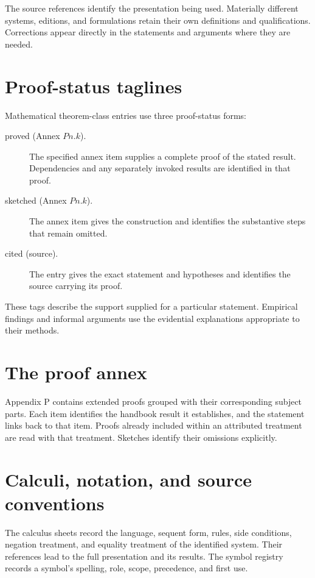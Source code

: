 The source references identify the presentation being used. Materially
different systems, editions, and formulations retain their own definitions
and qualifications. Corrections appear directly in the statements and
arguments where they are needed.

\section*{Proof-status taglines}

Mathematical theorem-class entries use three proof-status forms:
\begin{description}
\item[proved (Annex \(P n.k\)).]
The specified annex item supplies a complete proof of the stated result.
Dependencies and any separately invoked results are identified in that
proof.
\item[sketched (Annex \(P n.k\)).]
The annex item gives the construction and identifies the substantive
steps that remain omitted.
\item[cited (source).]
The entry gives the exact statement and hypotheses and identifies the
source carrying its proof.
\end{description}
These tags describe the support supplied for a particular statement.
Empirical findings and informal arguments use the evidential explanations
appropriate to their methods.

\section*{The proof annex}

Appendix P contains extended proofs grouped with their corresponding
subject parts. Each item identifies the handbook result it establishes,
and the statement links back to that item. Proofs already included within
an attributed treatment are read with that treatment. Sketches identify
their omissions explicitly.

\section*{Calculi, notation, and source conventions}
\label{sec:frontmatter-calculi-notation}

The calculus sheets record the language, sequent form, rules, side
conditions, negation treatment, and equality treatment of the identified
system. Their references lead to the full presentation and its results.
The symbol registry records a symbol's spelling, role, scope, precedence,
and first use.

